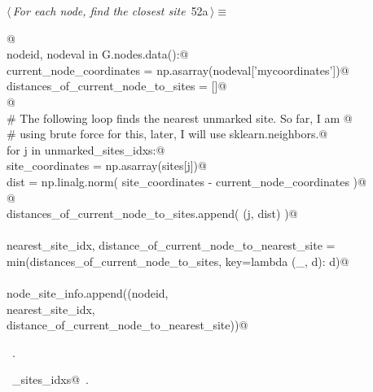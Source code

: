 \documentclass[11.5pt]{report}
\begin{document}
\vspace{-0.8cm} \newchunk
\begin{flushleft} \small
\begin{minipage}{\linewidth}\label{scrap76}\raggedright\small
{} $\langle\,${\itshape For each node, find the closest site}\nobreak\ {\footnotesize {52a}}$\,\rangle\equiv$
\vspace{-1ex}
\begin{list}{}{} \item
\mbox{}\verb@   @\\
\mbox{}\verb@for nodeid, nodeval in G.nodes.data():@\\
\mbox{}\verb@    current_node_coordinates = np.asarray(nodeval['mycoordinates'])@\\
\mbox{}\verb@    distances_of_current_node_to_sites = []@\\
\mbox{}\verb@               @\\
\mbox{}\verb@    # The following loop finds the nearest unmarked site. So far, I am @\\
\mbox{}\verb@    # using brute force for this, later, I will use sklearn.neighbors.@\\
\mbox{}\verb@    for j in unmarked_sites_idxs:@\\
\mbox{}\verb@        site_coordinates = np.asarray(sites[j])@\\
\mbox{}\verb@        dist             =  np.linalg.norm( site_coordinates - current_node_coordinates )@\\
\mbox{}\verb@                    @\\
\mbox{}\verb@        distances_of_current_node_to_sites.append( (j, dist) )@\\
\mbox{}\verb@@\\
\mbox{}\verb@        nearest_site_idx, distance_of_current_node_to_nearest_site = \@\\
\mbox{}\verb@                        min(distances_of_current_node_to_sites, key=lambda (_, d): d)@\\
\mbox{}\verb@@\\
\mbox{}\verb@        node_site_info.append((nodeid, \@\\
\mbox{}\verb@                                  nearest_site_idx, \@\\
\mbox{}\verb@                                  distance_of_current_node_to_nearest_site))@\\
\mbox{}\verb@@{\NWsep}
\end{list}
\vspace{-1.5ex}
\footnotesize
\begin{list}{}{\setlength{\itemsep}{-\parsep}\setlength{\itemindent}{-\leftmargin}}
\item \NWtxtMacroRefIn\ .
\item \NWtxtIdentsUsed\nobreak\  \verb@unmarked_sites_idxs@\nobreak\ .
\item{}
\end{list}
\end{minipage}\vspace{4ex}
\end{flushleft}
\end{document}
